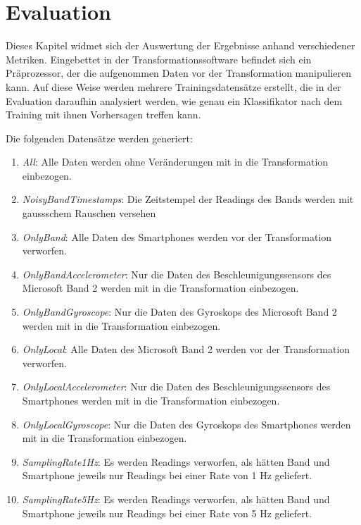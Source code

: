 \chapter{Evaluation}
\label{chap:evaluation}

Dieses Kapitel widmet sich der Auswertung der Ergebnisse anhand verschiedener Metriken. Eingebettet in der Transformationssoftware befindet sich ein Präprozessor, der die aufgenommen Daten vor der Transformation manipulieren kann. Auf diese Weise werden mehrere Trainingsdatensätze erstellt, die in der Evaluation daraufhin analysiert werden, wie genau ein Klassifikator nach dem Training mit ihnen Vorhersagen treffen kann.

Die folgenden Datensätze werden generiert:

\begin{enumerate}
\item \textit{All}: Alle Daten werden ohne Veränderungen mit in die Transformation einbezogen.
\item \textit{NoisyBandTimestamps}: Die Zeitstempel der Readings des Bands werden mit gaussschem Rauschen versehen
\item \textit{OnlyBand}: Alle Daten des Smartphones werden vor der Transformation verworfen.
\item \textit{OnlyBandAccelerometer}: Nur die Daten des Beschleunigungssensors des Microsoft Band 2 werden mit in die Transformation einbezogen.
\item \textit{OnlyBandGyroscope}: Nur die Daten des Gyroskops des Microsoft Band 2 werden mit in die Transformation einbezogen.
\item \textit{OnlyLocal}: Alle Daten des Microsoft Band 2 werden vor der Transformation verworfen.
\item \textit{OnlyLocalAccelerometer}: Nur die Daten des Beschleunigungssensors des Smartphones werden mit in die Transformation einbezogen.
\item \textit{OnlyLocalGyroscope}: Nur die Daten des Gyroskops des Smartphones werden mit in die Transformation einbezogen.
\item \textit{SamplingRate1Hz}: Es werden Readings verworfen, als hätten Band und Smartphone jeweils nur Readings bei einer Rate von 1 Hz geliefert.
\item \textit{SamplingRate5Hz}: Es werden Readings verworfen, als hätten Band und Smartphone jeweils nur Readings bei einer Rate von 5 Hz geliefert.
\end{enumerate}

